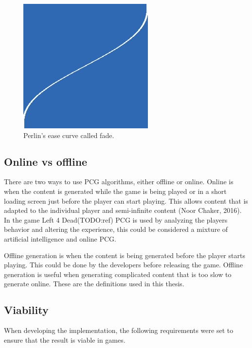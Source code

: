 		\begin{figure}[h]
			\centering
			\includegraphics[width=0.35\linewidth]{"images/fade"}
			\caption{Perlin's ease curve called fade.}
			\label{fig:fade}
		\end{figure}
	
	\subsection{Online vs offline}
	There are two ways to use PCG algorithms, either offline or online. Online is when the content is generated while the game is being played or in a short loading screen just before the player can start playing. This allows content that is adapted to the individual player and semi-infinite content (Noor Chaker, 2016). In the game Left 4 Dead(TODO:ref) PCG is used by analyzing the players behavior and altering the experience, this could be considered a mixture of artificial intelligence and online PCG.
	\par Offline generation is when the content is being generated before the player starts playing. This could be done by the developers before releasing the game. Offline generation is useful when generating complicated content that is too slow to generate online.
	These are the definitions used in this thesis.
	
	
	\subsection{Viability}
	When developing the implementation, the following requirements were set to ensure that the result is viable in games.
	
